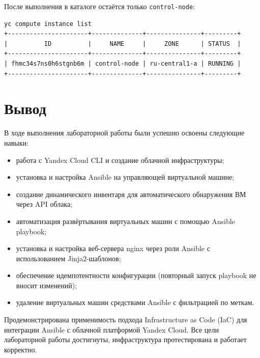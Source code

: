 \documentclass[12pt,a4paper]{article}
\begin{document}
После выполнения в каталоге остаётся только \texttt{control-node}:

\begin{lstlisting}
yc compute instance list
+----------------------+--------------+---------------+---------+
|          ID          |     NAME     |     ZONE      | STATUS  |
+----------------------+--------------+---------------+---------+
| fhmc34s7ns0h6stgnb6m | control-node | ru-central1-a | RUNNING |
+----------------------+--------------+---------------+---------+
\end{lstlisting}

\section{Вывод}

В ходе выполнения лабораторной работы были успешно освоены следующие навыки:

\begin{itemize}
    \item работа с Yandex Cloud CLI и создание облачной инфраструктуры;
    \item установка и настройка Ansible на управляющей виртуальной машине;
    \item создание динамического инвентаря для автоматического обнаружения ВМ через API облака;
    \item автоматизация развёртывания виртуальных машин с помощью Ansible playbook;
    \item установка и настройка веб-сервера nginx через роли Ansible с использованием Jinja2-шаблонов;
    \item обеспечение идемпотентности конфигурации (повторный запуск playbook не вносит изменений);
    \item удаление виртуальных машин средствами Ansible с фильтрацией по меткам.
\end{itemize}

Продемонстрирована применимость подхода Infrastructure as Code (IaC) для интеграции Ansible с облачной платформой Yandex Cloud. Все цели лабораторной работы достигнуты, инфраструктура протестирована и работает корректно.
\end{document}
